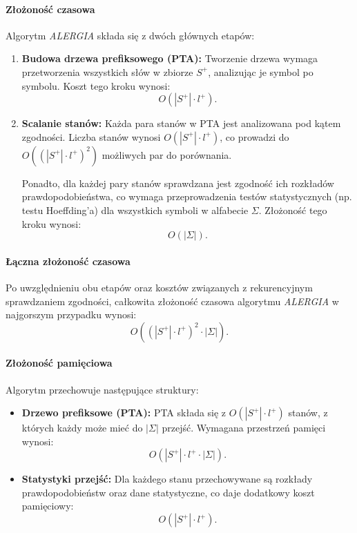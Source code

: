 \paragraph*{Złożoność czasowa}  
Algorytm \textit{ALERGIA} składa się z dwóch głównych etapów:  
\begin{enumerate}  
    \item \textbf{Budowa drzewa prefiksowego (PTA):}  
    Tworzenie drzewa wymaga przetworzenia wszystkich słów w zbiorze \( S^+ \), analizując je symbol po symbolu. Koszt tego kroku wynosi:  
    \[
    O(|S^+| \cdot l^+).
    \]  

    \item \textbf{Scalanie stanów:}  
    Każda para stanów w PTA jest analizowana pod kątem zgodności. Liczba stanów wynosi \( O(|S^+| \cdot l^+) \), co prowadzi do \( O((|S^+| \cdot l^+)^2) \) możliwych par do porównania.  

    Ponadto, dla każdej pary stanów sprawdzana jest zgodność ich rozkładów prawdopodobieństwa, co wymaga przeprowadzenia testów statystycznych (np. testu Hoeffding’a) dla wszystkich symboli w alfabecie \( \Sigma \). Złożoność tego kroku wynosi:  
    \[
    O(|\Sigma|).
    \]
\end{enumerate}  

\paragraph*{Łączna złożoność czasowa}  
Po uwzględnieniu obu etapów oraz kosztów związanych z rekurencyjnym sprawdzaniem zgodności, całkowita złożoność czasowa algorytmu \textit{ALERGIA} w najgorszym przypadku wynosi:  
\[
O((|S^+| \cdot l^+)^2 \cdot |\Sigma|).
\]

\paragraph*{Złożoność pamięciowa}  
Algorytm przechowuje następujące struktury:  
\begin{itemize}  
    \item \textbf{Drzewo prefiksowe (PTA):}  
    PTA składa się z \( O(|S^+| \cdot l^+) \) stanów, z których każdy może mieć do \( |\Sigma| \) przejść. Wymagana przestrzeń pamięci wynosi:  
    \[
    O(|S^+| \cdot l^+ \cdot |\Sigma|).
    \]  

    \item \textbf{Statystyki przejść:}  
    Dla każdego stanu przechowywane są rozkłady prawdopodobieństw oraz dane statystyczne, co daje dodatkowy koszt pamięciowy:  
    \[
    O(|S^+| \cdot l^+).
    \]  
\end{itemize}  

